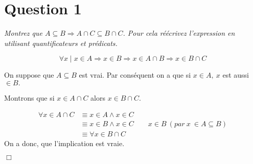 \section*{Question 1}
\emph{Montrez que \( A \subseteq B \Rightarrow A \cap C \subseteq B \cap C\). Pour cela réécrivez l’expression en utilisant quantificateurs et prédicats.}


\[\forall x \mid x \in A \Rightarrow x \in B \Rightarrow x \in A \cap B \Rightarrow x \in B \cap C\]

\bigskip
On suppose que $A \subseteq B$ est vrai. Par conséquent on a que si $x \in A,\ x$ est aussi $\in B.$
	
Montrons que si $x \in A \cap C$ alors $x \in B \cap C$.

\begin{align*}
	\forall x \in A \cap C &\equiv x \in A \wedge x \in C\\
	&\equiv x \in B \wedge x \in C \qquad x \in B\ (par\ x\ \in A \subseteq B)\\
	&\equiv \forall x \in B \cap C
\end{align*}
\smallskip
On a donc, que l'implication est vraie.
\begin{flushright}
	$\Box$
\end{flushright}